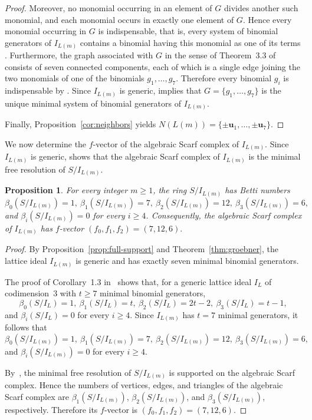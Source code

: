 \documentclass[10pt,a4paper]{amsart}
\newtheorem{proposition}[theorem]{Proposition}
\begin{document}
\begin{proof}
Moreover, no monomial occurring in an element of $G$ divides another
such monomial, and each monomial occurs in exactly one element of $G$.
Hence every monomial occurring in $G$ is indispensable, that is, every
system of binomial generators of $I_{L(m)}$ contains a binomial having
this monomial as one of its terms
\cite[Remark~2.3]{CTV}. Furthermore, the graph associated with $G$ in
the sense of Theorem~3.3 of~\cite{CTV} consists of seven connected
components, each of which is a single edge joining the two monomials
of one of the binomials $g_1,\ldots,g_7$. Therefore every binomial
$g_i$ is indispensable by \cite[Theorem~3.3]{CTV}. Since
$I_{L(m)}$ is generic, \cite[Remark~4.4(3)]{PS}
implies that $G=\{g_1,\ldots,g_7\}$ is the unique minimal system of
binomial generators of $I_{L(m)}$. 

Finally, Proposition~\ref{cor:neighbors} yields
$
N(L(m))=\{\pm\mathbf u_1,\ldots,\pm\mathbf u_7\}.$
\end{proof}


We now determine the $f$-vector of the algebraic Scarf complex of
$I_{L(m)}$. Since $I_{L(m)}$ is generic, \cite[Theorem~4.2]{PS} shows that the algebraic Scarf complex of
$I_{L(m)}$ is the minimal free resolution of $S/I_{L(m)}$.


\begin{proposition}\label{prop:scarf}
For every integer $m\ge1$, the ring $S/I_{L(m)}$ has Betti numbers
$$
\beta_0(S/I_{L(m)})=1, \ \beta_1(S/I_{L(m)})=7, \ \beta_2(S/I_{L(m)})=12, \ \beta_3(S/I_{L(m)})=6,$$ and
$
\beta_i(S/I_{L(m)})=0$ for every $i \geq 4$. Consequently, the algebraic Scarf complex of $I_{L(m)}$ has
$f$-vector
$
(f_0,f_1,f_2)=(7,12,6).$
\end{proposition}
 
\begin{proof} By Proposition~\ref{prop:full-support} and
Theorem~\ref{thm:groebner}, the lattice ideal $I_{L(m)}$ is generic
and has exactly seven minimal binomial generators.

The proof of Corollary~1.3 in~\cite{Ojeda} shows that, for a generic
lattice ideal $I_L$ of codimension~$3$ with $t\ge7$ minimal binomial
generators,
\[
\beta_0(S/I_L)=1, \
\beta_1(S/I_L)=t, \
\beta_2(S/I_L)=2t-2, \
\beta_3(S/I_L)=t-1,
\]
and
$
\beta_i(S/I_L)=0$ for every $i \geq 4$.
Since $I_{L(m)}$ has $t=7$ minimal generators, it follows that
\[
\beta_0(S/I_{L(m)})=1, \
\beta_1(S/I_{L(m)})=7, \
\beta_2(S/I_{L(m)})=12, \
\beta_3(S/I_{L(m)})=6,
\]
and
$
\beta_i(S/I_{L(m)})=0$ for every $i \geq 4$.

By~\cite[Theorem~4.2]{PS}, the minimal free resolution of
$S/I_{L(m)}$ is supported on the algebraic Scarf complex.
Hence the numbers of vertices, edges, and triangles of the algebraic
Scarf complex are
$\beta_1(S/I_{L(m)})$,
$\beta_2(S/I_{L(m)})$, and
$\beta_3(S/I_{L(m)})$, respectively.
Therefore its $f$-vector is $
(f_0,f_1,f_2)=(7,12,6).$
\end{proof}
\end{document}
